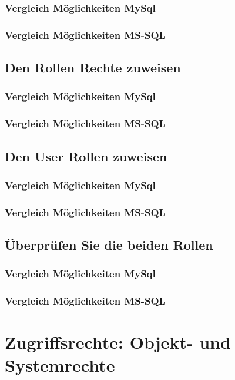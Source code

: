 \documentclass[11pt,a4paper,parskip=half]{scrartcl}
\begin{document}
\subsubsection{Vergleich Möglichkeiten MySql}
\subsubsection{Vergleich Möglichkeiten MS-SQL}

\subsection{Den Rollen Rechte zuweisen}
\subsubsection{Vergleich Möglichkeiten MySql}
\subsubsection{Vergleich Möglichkeiten MS-SQL}

\subsection{Den User Rollen zuweisen}
\subsubsection{Vergleich Möglichkeiten MySql}
\subsubsection{Vergleich Möglichkeiten MS-SQL}

\subsection{Überprüfen Sie die beiden Rollen}
\subsubsection{Vergleich Möglichkeiten MySql}
\subsubsection{Vergleich Möglichkeiten MS-SQL}

\section{Zugriffsrechte: Objekt- und Systemrechte}
\end{document}
